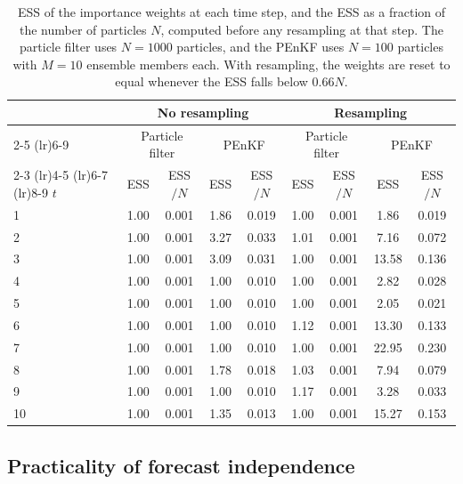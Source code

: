 \documentclass[12pt]{article}
\begin{document}
\begin{table}[ht]
    \centering
    \small
    \begin{tabular}{lcccccccc}
        \toprule
        & \multicolumn{4}{c}{No resampling} & \multicolumn{4}{c}{Resampling} \\
        \cmidrule(lr){2-5} \cmidrule(lr){6-9}
        & \multicolumn{2}{c}{Particle filter} & \multicolumn{2}{c}{PEnKF}
        & \multicolumn{2}{c}{Particle filter} & \multicolumn{2}{c}{PEnKF} \\
        \cmidrule(lr){2-3} \cmidrule(lr){4-5} \cmidrule(lr){6-7} \cmidrule(lr){8-9}
        $t$ & ESS & ESS$/N$ & ESS & ESS$/N$ & ESS & ESS$/N$ & ESS & ESS$/N$ \\
        \midrule
        1 & 1.00 & 0.001 & 1.86 & 0.019 & 1.00 & 0.001 & 1.86 & 0.019 \\
        2 & 1.00 & 0.001 & 3.27 & 0.033 & 1.01 & 0.001 & 7.16 & 0.072 \\
        3 & 1.00 & 0.001 & 3.09 & 0.031 & 1.00 & 0.001 & 13.58 & 0.136 \\
        4 & 1.00 & 0.001 & 1.00 & 0.010 & 1.00 & 0.001 & 2.82 & 0.028 \\
        5 & 1.00 & 0.001 & 1.00 & 0.010 & 1.00 & 0.001 & 2.05 & 0.021 \\
        6 & 1.00 & 0.001 & 1.00 & 0.010 & 1.12 & 0.001 & 13.30 & 0.133 \\
        7 & 1.00 & 0.001 & 1.00 & 0.010 & 1.00 & 0.001 & 22.95 & 0.230 \\
        8 & 1.00 & 0.001 & 1.78 & 0.018 & 1.03 & 0.001 & 7.94 & 0.079 \\
        9 & 1.00 & 0.001 & 1.00 & 0.010 & 1.17 & 0.001 & 3.28 & 0.033 \\
        10 & 1.00 & 0.001 & 1.35 & 0.013 & 1.00 & 0.001 & 15.27 & 0.153 \\
        \bottomrule
    \end{tabular}
    \caption{ESS of the importance weights at each time
    step, and the ESS as a fraction of the number of particles $N$, computed
    before any resampling at that step. The particle filter uses $N = 1000$
    particles, and the PEnKF uses $N = 100$ particles with $M = 10$ ensemble
    members each. With resampling, the weights are reset to equal whenever the
    ESS falls below $0.66N$.}
    \label{tab:ess}
\end{table}

\subsection{Practicality of forecast independence}\label{sec:one_step}
\end{document}
